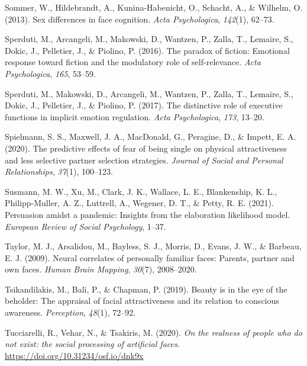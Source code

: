 \documentclass[
  man,floatsintext]{apa6}
\newlength{\cslhangindent}
\newlength{\cslentryspacingunit} %
\newenvironment{CSLReferences}[2] %
 {%
  \setlength{\parindent}{0pt}
  \ifodd #1
  \let\oldpar\par
  \def\par{\hangindent=\cslhangindent\oldpar}
  \fi
  \setlength{\parskip}{#2\cslentryspacingunit}
 }%
 {}
\begin{document}
\begin{CSLReferences}{1}{0}
\leavevmode{}%
Sommer, W., Hildebrandt, A., Kunina-Habenicht, O., Schacht, A., \& Wilhelm, O. (2013). Sex differences in face cognition. \emph{Acta Psychologica}, \emph{142}(1), 62--73.

\leavevmode{}%
Sperduti, M., Arcangeli, M., Makowski, D., Wantzen, P., Zalla, T., Lemaire, S., Dokic, J., Pelletier, J., \& Piolino, P. (2016). The paradox of fiction: Emotional response toward fiction and the modulatory role of self-relevance. \emph{Acta Psychologica}, \emph{165}, 53--59.

\leavevmode{}%
Sperduti, M., Makowski, D., Arcangeli, M., Wantzen, P., Zalla, T., Lemaire, S., Dokic, J., Pelletier, J., \& Piolino, P. (2017). The distinctive role of executive functions in implicit emotion regulation. \emph{Acta Psychologica}, \emph{173}, 13--20.

\leavevmode{}%
Spielmann, S. S., Maxwell, J. A., MacDonald, G., Peragine, D., \& Impett, E. A. (2020). The predictive effects of fear of being single on physical attractiveness and less selective partner selection strategies. \emph{Journal of Social and Personal Relationships}, \emph{37}(1), 100--123.

\leavevmode{}%
Susmann, M. W., Xu, M., Clark, J. K., Wallace, L. E., Blankenship, K. L., Philipp-Muller, A. Z., Luttrell, A., Wegener, D. T., \& Petty, R. E. (2021). Persuasion amidst a pandemic: Insights from the elaboration likelihood model. \emph{European Review of Social Psychology}, 1--37.

\leavevmode{}%
Taylor, M. J., Arsalidou, M., Bayless, S. J., Morris, D., Evans, J. W., \& Barbeau, E. J. (2009). Neural correlates of personally familiar faces: Parents, partner and own faces. \emph{Human Brain Mapping}, \emph{30}(7), 2008--2020.

\leavevmode{}%
Tsikandilakis, M., Bali, P., \& Chapman, P. (2019). Beauty is in the eye of the beholder: The appraisal of facial attractiveness and its relation to conscious awareness. \emph{Perception}, \emph{48}(1), 72--92.

\leavevmode{}%
Tucciarelli, R., Vehar, N., \& Tsakiris, M. (2020). \emph{On the realness of people who do not exist: the social processing of artificial faces}. \url{https://doi.org/10.31234/osf.io/dnk9x}


\end{CSLReferences}
\end{document}
